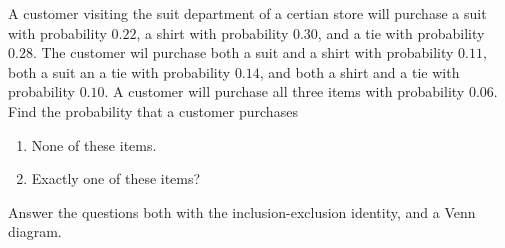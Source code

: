 \documentclass[fleqn, a4paper, 11pt, oneside]{amsart}
\theoremstyle{definition}
\theoremstyle{theorem}
\begin{document}
\begin{question}
	A customer visiting the suit department of a certian store will purchase a suit with probability $0.22$, a shirt with probability $0.30$, and a tie with probability $0.28$.
	The customer wil purchase both a suit and a shirt with probability $0.11$, both a suit an a tie with probability $0.14$, and both a shirt and a tie with probability $0.10$.
	A customer will purchase all three items with probability $0.06$.\\
	Find the probability that a customer purchases
	\begin{enumerate}
		\item None of these items.
		\item Exactly one of these items?
	\end{enumerate}
	Answer the questions both with the inclusion-exclusion identity, and a Venn diagram.
\end{question}
\end{document}
